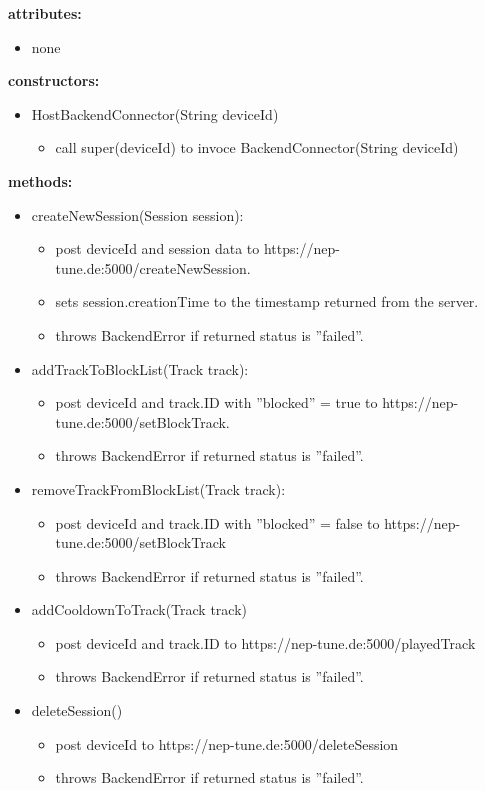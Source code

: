 \documentclass[oneside, ngerman]{sdqtechreport}
\begin{document}
\textbf{attributes:}
\begin{itemize}
     \item none
\end{itemize}
\textbf{constructors:}
\begin{itemize}
    \item HostBackendConnector(String deviceId)
    \begin{itemize}
        \item call super(deviceId) to invoce BackendConnector(String deviceId)
    \end{itemize}
\end{itemize}
\textbf{methods:}
\begin{itemize}
    \item createNewSession(Session session):
    \begin{itemize}
        \item post deviceId and session data to https://nep-tune.de:5000/createNewSession.
        \item sets session.creationTime to the timestamp returned from the server.
        \item throws BackendError if returned status is ''failed''.
    \end{itemize}
    \item addTrackToBlockList(Track track):
    \begin{itemize}
        \item post deviceId and track.ID with ''blocked'' = true to https://nep-tune.de:5000/setBlockTrack.
        \item throws BackendError if returned status is ''failed''.
    \end{itemize}
    \item removeTrackFromBlockList(Track track):
    \begin{itemize}
        \item post deviceId and track.ID  with ''blocked'' = false to https://nep-tune.de:5000/setBlockTrack
        \item throws BackendError if returned status is ''failed''.
    \end{itemize}
    \item addCooldownToTrack(Track track)
    \begin{itemize}
        \item post deviceId and track.ID  to https://nep-tune.de:5000/playedTrack
        \item throws BackendError if returned status is ''failed''.
    \end{itemize}
    \item deleteSession()
    \begin{itemize}
        \item post deviceId to https://nep-tune.de:5000/deleteSession
        \item throws BackendError if returned status is ''failed''.
    \end{itemize}
\end{itemize}
\end{document}
